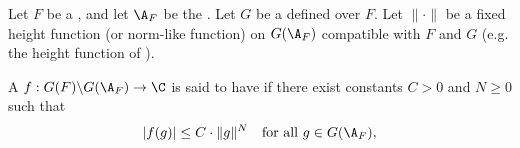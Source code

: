 \begin{definition} \label{definition:moderate_growth_for_a_function_on_the_adelic_quotient_group_of_a_linear_algebraic_group_over_a_global_field}
    Let $F$ be a , and let $\A_F$ be the . Let $G$ be a  defined over $F$. 
    Let $\|\cdot\|$ be a fixed height function (or norm-like function) on $G(\A_F)$ compatible with $F$ and $G$ (e.g. the height function of ).

    A  $f: G(F)\backslash G(\A_F) \to \C$ is said to have  if there exist constants $C > 0$ and $N \geq 0$ such that
    $$
    |f(g)| \leq C \cdot \|g\|^N \quad \text{for all } g \in G(\A_F),
    $$
\end{definition}